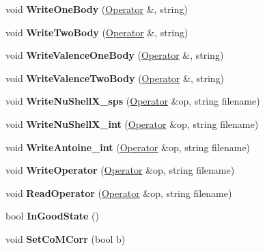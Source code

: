 \begin{DoxyCompactItemize}
\item 
\hypertarget{classReadWrite_a257e2a926e252a2952b330b3655ddd3d}{void {\bfseries Write\-One\-Body} (\hyperlink{classOperator}{Operator} \&, string)}\label{classReadWrite_a257e2a926e252a2952b330b3655ddd3d}

\item 
\hypertarget{classReadWrite_a7bae483d2d587b66b3bf5ed734139cde}{void {\bfseries Write\-Two\-Body} (\hyperlink{classOperator}{Operator} \&, string)}\label{classReadWrite_a7bae483d2d587b66b3bf5ed734139cde}

\item 
\hypertarget{classReadWrite_a75dd4196074d74e1e7ea0e0b10aafc85}{void {\bfseries Write\-Valence\-One\-Body} (\hyperlink{classOperator}{Operator} \&, string)}\label{classReadWrite_a75dd4196074d74e1e7ea0e0b10aafc85}

\item 
\hypertarget{classReadWrite_aeb9256b7a68dcb45fac250b45af07548}{void {\bfseries Write\-Valence\-Two\-Body} (\hyperlink{classOperator}{Operator} \&, string)}\label{classReadWrite_aeb9256b7a68dcb45fac250b45af07548}

\item 
\hypertarget{classReadWrite_a8a7dc85b22c8f468d153d3fde9f39394}{void {\bfseries Write\-Nu\-Shell\-X\-\_\-sps} (\hyperlink{classOperator}{Operator} \&op, string filename)}\label{classReadWrite_a8a7dc85b22c8f468d153d3fde9f39394}

\item 
\hypertarget{classReadWrite_a2028159ab7f8c227613834b39794e157}{void {\bfseries Write\-Nu\-Shell\-X\-\_\-int} (\hyperlink{classOperator}{Operator} \&op, string filename)}\label{classReadWrite_a2028159ab7f8c227613834b39794e157}

\item 
\hypertarget{classReadWrite_a371194595d9412cbb8f1b432a6526f5a}{void {\bfseries Write\-Antoine\-\_\-int} (\hyperlink{classOperator}{Operator} \&op, string filename)}\label{classReadWrite_a371194595d9412cbb8f1b432a6526f5a}

\item 
\hypertarget{classReadWrite_a771ed1ac7ca0cc9cb6a209da170dd351}{void {\bfseries Write\-Operator} (\hyperlink{classOperator}{Operator} \&op, string filename)}\label{classReadWrite_a771ed1ac7ca0cc9cb6a209da170dd351}

\item 
\hypertarget{classReadWrite_ab924c67864c7af28bcc22a9b87abafb3}{void {\bfseries Read\-Operator} (\hyperlink{classOperator}{Operator} \&op, string filename)}\label{classReadWrite_ab924c67864c7af28bcc22a9b87abafb3}

\item 
\hypertarget{classReadWrite_a05ec8e21842e94d788bb36c7d11f46b9}{bool {\bfseries In\-Good\-State} ()}\label{classReadWrite_a05ec8e21842e94d788bb36c7d11f46b9}

\item 
\hypertarget{classReadWrite_a5e81dd4ce4adfe6fc08af81440003bb9}{void {\bfseries Set\-Co\-M\-Corr} (bool b)}\label{classReadWrite_a5e81dd4ce4adfe6fc08af81440003bb9}

\end{DoxyCompactItemize}
